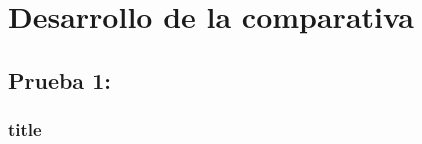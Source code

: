\documentclass[11pt,a4paper,spanish]{book}
\begin{document}
	\chapter{Desarrollo de la comparativa}
		\section{Prueba 1: }
		\subsection{title}
		
		
		
		
		
		
		
		
		
		
		
		
		
		
		
		
		
\end{document}
